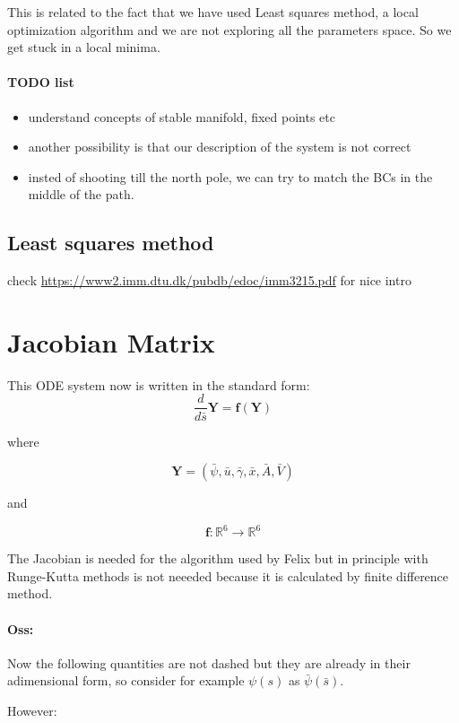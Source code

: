 \documentclass[12pt]{article}
\begin{document}
This is related to the fact that we have used Least squares method, a local optimization algorithm and we are not exploring all the parameters space. So we get stuck in a local minima.

\paragraph{TODO list}
\begin{itemize}
  \item understand concepts of stable manifold, fixed points etc
  \item another possibility is that our description of the system is not correct
  \item insted of shooting till the north pole, we can try to match the BCs in the middle of the path.
\end{itemize}


\subsection{Least squares method}
check \url{https://www2.imm.dtu.dk/pubdb/edoc/imm3215.pdf} for nice intro





\appendix
\section{Jacobian Matrix}
This ODE system now is written in the standard form:
$$
\frac{d}{d\bar{s}} \mathbf{Y} = \mathbf{f} (\mathbf{Y})
$$

where 

$$
\mathbf{Y} = (\bar{\psi},\bar{u},\bar{\gamma},\bar{x},\bar{A},\bar{V})
$$

and 

$$
\mathbf{f}:\mathbb{R}^6 \to \mathbb{R}^6
$$


The Jacobian is needed for the algorithm used by Felix but in principle with Runge-Kutta methods is not neeeded because it is calculated by finite difference method.

\paragraph{Oss:} Now the following quantities are not dashed but they are already in their adimensional form, so consider for example $\psi(s)$ as $\bar{\psi}(\bar{s})$.

However:
\end{document}
